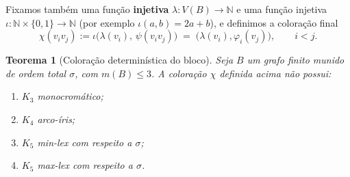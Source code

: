 \documentclass[reqno, 12pt]{amsart}
\numberwithin{equation}{section}
\theoremstyle{plain}
\newtheorem{theorem}{Teorema}[section]
\theoremstyle{definition}
\begin{document}
Fixamos também uma função \textbf{injetiva} $\lambda:V(B)\to\mathbb{N}$
e uma função injetiva $\iota:\mathbb{N}\times\{0,1\}\to\mathbb{N}$
(por exemplo $\iota(a,b)=2a+b$), e definimos a coloração final
\[
  \chi(v_iv_j):=\iota\bigl(\lambda(v_i),\,\psi(v_iv_j)\bigr)
  \;=\;\bigl(\lambda(v_i),\varphi_i(v_j)\bigr),
  \qquad i<j.
\]

\begin{theorem}[Coloração determinística do bloco]
  \label{thm:coloracao-bloco}
  Seja $B$ um grafo finito munido de ordem total $\sigma$, com
  $m(B)\leq 3$. A coloração $\chi$ definida acima não possui:
  \begin{enumerate}
    \item[(i)] $K_3$ monocromático;
    \item[(ii)] $K_4$ arco-íris;
    \item[(iii)] $K_5$ min-lex com respeito a $\sigma$;
    \item[(iv)] $K_5$ max-lex com respeito a $\sigma$.
  \end{enumerate}
\end{theorem}
\end{document}

